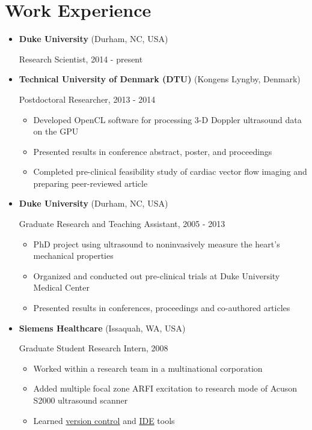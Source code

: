 \documentclass[letterpaper,10pt,english]{sphinxmanual}
\begin{document}
\section{Work Experience}
\label{resume:work-experience}\begin{itemize}
\item {} 
\textbf{Duke University} (Durham, NC, USA)

Research Scientist, 2014 - present

\item {} 
\textbf{Technical University of Denmark (DTU)} (Kongens Lyngby, Denmark)

Postdoctoral Researcher, 2013 - 2014
\begin{itemize}
\item {} 
Developed OpenCL software for processing 3-D Doppler ultrasound
data on the GPU

\item {} 
Presented results in conference abstract, poster, and proceedings

\item {} 
Completed pre-clinical feasibility study of cardiac vector flow
imaging and preparing peer-reviewed article

\end{itemize}

\item {} 
\textbf{Duke University} (Durham, NC, USA)

Graduate Research and Teaching Assistant, 2005 - 2013
\begin{itemize}
\item {} 
PhD project using ultrasound to noninvasively measure the heart's
mechanical properties

\item {} 
Organized and conducted out pre-clinical trials at Duke University
Medical Center

\item {} 
Presented results in conferences, proceedings and co-authored
articles

\end{itemize}

\item {} 
\textbf{Siemens Healthcare} (Issaquah, WA, USA)

Graduate Student Research Intern, 2008
\begin{itemize}
\item {} 
Worked within a research team in a multinational corporation

\item {} 
Added multiple focal zone ARFI excitation to research mode of
Acuson S2000 ultrasound scanner

\item {} 
Learned \href{http://www-03.ibm.com/software/products/en/clearcase}{version
control}
and \href{http://www.visualstudio.com/}{IDE} tools

\end{itemize}

\end{itemize}
\end{document}
